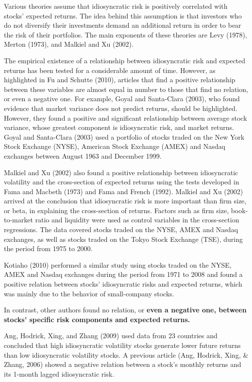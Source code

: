 Various theories assume that idiosyncratic risk is positively correlated with stocks' expected returns. The idea behind this assumption is that investors who do not diversify their investments demand an additional return in order to bear the risk of their portfolios. The main exponents of these theories are Levy (1978), Merton (1973), and Malkiel and Xu (2002).

The empirical existence of a relationship between idiosyncratic risk and expected returns has been tested for a considerable amount of time. However, as highlighted in Fu and Schutte (2010), articles that find a positive relationship between these variables are almost equal in number to those that find no relation, or even a negative one. For example, Goyal and Santa-Clara (2003), who found evidence that market variance does not predict returns, should be highlighted. However, they found a positive and significant relationship between average stock variance, whose greatest component is idiosyncratic risk, and market returns. Goyal and Santa-Clara (2003) used a portfolio of stocks traded on the New York Stock Exchange (NYSE), American Stock Exchange (AMEX) and Nasdaq exchanges between August 1963 and December 1999.

Malkiel and Xu (2002) also found a positive relationship between idiosyncratic volatility and the cross-section of expected returns using the tests developed in Fama and Macbeth (1973) and Fama and French (1992). Malkiel and Xu (2002) arrived at the conclusion that idiosyncratic risk is more important than firm size, or beta, in explaining the cross-section of returns. Factors such as firm size, book-to-market ratio and liquidity were used as control variables in the cross-section regressions. The data covered stocks traded on the NYSE, AMEX and Nasdaq exchanges, as well as stocks traded on the Tokyo Stock Exchange (TSE), during the period from 1975 to 2000.

Kotiaho (2010) performed a similar study using stocks traded on the NYSE, AMEX and Nasdaq exchanges during the period from 1971 to 2008 and found a positive relation between stocks' idiosyncratic risks and expected returns, which was mainly due to the behavior of small-company stocks.

In contrast, other authors found no relation, or \textbf{even a negative one, between stocks' specific risk components and expected returns.}

Ang, Hodrick, Xing, and Zhang (2009) used data from 23 countries and concluded that high idiosyncratic volatility stocks generate lower future returns than low idiosyncratic volatility stocks. A previous article (Ang, Hodrick, Xing, & Zhang, 2006) showed a negative relation between a stock's monthly returns and its 1-month lagged idiosyncratic risk.

